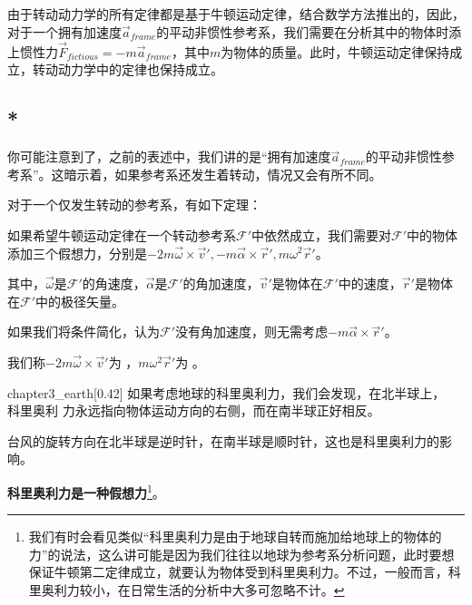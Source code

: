 \subsection[非惯性力]{}
由于转动动力学的所有定律都是基于牛顿运动定律，结合数学方法推出的，因此，对于一个拥有加速度$\vec{a}_{frame}$的平动非惯性参考系，我们需要在分析其中的物体时添上惯性力$\vec{F}_{fictious}=-m\vec{a}_{frame}$，其中$m$为物体的质量。此时，牛顿运动定律保持成立，转动动力学中的定律也保持成立。

\subsection[科里奥利力*]{*}
你可能注意到了，之前的表述中，我们讲的是“拥有加速度$\vec{a}_{frame}$的平动非惯性参考系”。这暗示着，如果参考系还发生着转动，情况又会有所不同。

对于一个仅发生转动的参考系，有如下定理：
\begin{law}
    如果希望牛顿运动定律在一个转动参考系$\mathcal{F}'$中依然成立，我们需要对$\mathcal{F}'$中的物体添加三个假想力，分别是$-2m\vec{\omega}\times\vec{v}',-m\vec{\alpha}\times\vec{r}',m\omega^2\vec{r}'$。

    其中，$\vec{\omega}$是$\mathcal{F}'$的角速度，$\vec{\alpha}$是$\mathcal{F}'$的角加速度，$\vec{v}'$是物体在$\mathcal{F}'$中的速度，$\vec{r}'$是物体在$\mathcal{F}'$中的极径矢量。

    如果我们将条件简化，认为$\mathcal{F}'$没有角加速度，则无需考虑$-m\vec{\alpha}\times\vec{r}'$。

    我们称$-2m\vec{\omega}\times\vec{v}'$为 ，$m\omega^2\vec{r}'$为 。
\end{law}
\begin{singlefigure}[地球的科里奥利力]{chapter3_earth}[0.42]
    如果考虑地球的科里奥利力，我们会发现，在北半球上，\\科里奥利
    力永远指向物体运动方向的右侧，而在南半球正好相反。
\end{singlefigure}
台风的旋转方向在北半球是逆时针，在南半球是顺时针，这也是科里奥利力的影响。

{\bfseries 科里奥利力是一种假想力}\footnote{我们有时会看见类似“科里奥利力是由于地球自转而施加给地球上的物体的力”的说法，这么讲可能是因为我们往往以地球为参考系分析问题，此时要想保证牛顿第二定律成立，就要认为物体受到科里奥利力。不过，一般而言，科里奥利力较小，在日常生活的分析中大多可忽略不计。}。
